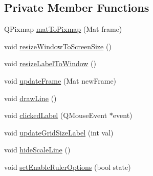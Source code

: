 \subsection*{Private Member Functions}
\begin{DoxyCompactItemize}
\item 
Q\+Pixmap \mbox{\hyperlink{classMeasuringInterface_ae5ad3ff4b380dd0465378dabc4265218}{mat\+To\+Pixmap}} (Mat frame)
\item 
void \mbox{\hyperlink{classMeasuringInterface_aad66adca9dfebeb4bec1a83c1fd7c043}{resize\+Window\+To\+Screen\+Size}} ()
\item 
void \mbox{\hyperlink{classMeasuringInterface_a167a8fe58e371ea039490e90aa07c87d}{resize\+Label\+To\+Window}} ()
\item 
void \mbox{\hyperlink{classMeasuringInterface_ac117ad50a7b325e4aff2651a6a04d1f4}{update\+Frame}} (Mat new\+Frame)
\item 
void \mbox{\hyperlink{classMeasuringInterface_a0a8a206b6c86b0903943ae0646d09ff8}{draw\+Line}} ()
\item 
void \mbox{\hyperlink{classMeasuringInterface_a62ef5d03298c79e95511272a0c113ab8}{clicked\+Label}} (Q\+Mouse\+Event $\ast$event)
\item 
void \mbox{\hyperlink{classMeasuringInterface_a049b5fba322e426db13761cf8d66f8a2}{update\+Grid\+Size\+Label}} (int val)
\item 
void \mbox{\hyperlink{classMeasuringInterface_ad6344a968dacd55de9a7509698442d67}{hide\+Scale\+Line}} ()
\item 
void \mbox{\hyperlink{classMeasuringInterface_acf541a942e47266c30a8d473de4aca98}{set\+Enable\+Ruler\+Options}} (bool state)
\end{DoxyCompactItemize}
